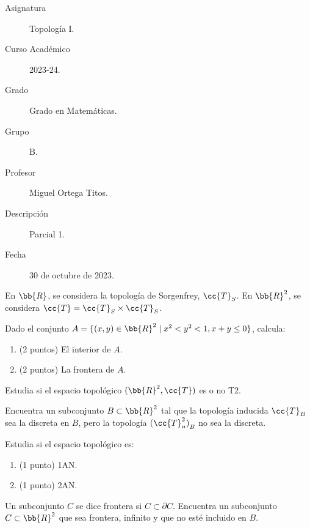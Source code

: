 \documentclass[12pt]{article}
\newcommand{\T}[0]{\cc{T}}
\begin{document}

    
    

    \begin{description}
        \item[Asignatura] Topología I.
        \item[Curso Académico] 2023-24.
        \item[Grado] Grado en Matemáticas.
        \item[Grupo] B.
        \item[Profesor] Miguel Ortega Titos.
        \item[Descripción] Parcial 1.
        \item[Fecha] 30 de octubre de 2023.
    
    \end{description}
    \newpage
    
    En $\bb{R}$, se considera la topología de Sorgenfrey, $\T_S$. En $\bb{R}^2$, se considera $\T=\T_S\times \T_S$.
    \begin{ejercicio}
        Dado el conjunto $A=\{(x,y)\in \bb{R}^2\mid x^2<y^2<1, x+y\leq 0\}$, calcula:
        \begin{enumerate}
            \item (2 puntos) El interior de $A$.
            \item (2 puntos) La frontera de $A$.
        \end{enumerate}
    \end{ejercicio}

    \begin{ejercicio}[1 punto]
        Estudia si el espacio topológico $(\bb{R}^2,\T)$ es o no T2.
    \end{ejercicio}

    \begin{ejercicio}[1.5 puntos]
        Encuentra un subconjunto $B\subset \bb{R}^2$ tal que la topología inducida $\T_{B}$ sea la discreta en $B$, pero la topología ${(\T_u^2)}_B$ no sea la discreta.
    \end{ejercicio}

    \begin{ejercicio}
        Estudia si el espacio topológico es:
        \begin{enumerate}
            \item (1 punto) 1AN.
            \item (1 punto) 2AN.
        \end{enumerate}
    \end{ejercicio}

    \begin{ejercicio}[1.5 puntos]
        Un subconjunto $C$ se dice frontera si $C\subset \partial C$. Encuentra un subconjunto $C\subset \bb{R}^2$ que sea frontera, infinito y que no esté incluido en $B$.
    \end{ejercicio}
\end{document}
